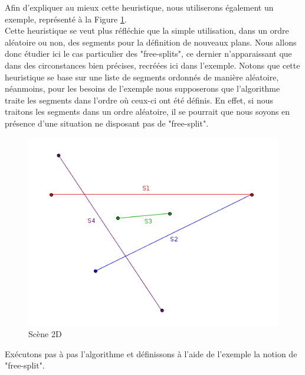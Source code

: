 \documentclass[11pt,a4paper]{article}
\theoremstyle{definition}
\theoremstyle{remark}
\begin{document}
Afin d'expliquer au mieux cette heuristique, nous utiliserons également un exemple, représenté à la Figure \ref{scene_splits}. \\

Cette heuristique se veut plus réfléchie que la simple utilisation, dans un ordre aléatoire ou non, des segments pour la définition de nouveaux plans. Nous allons donc étudier ici le cas particulier des "free-splits", ce dernier n'apparaissant que dans des circonstances bien précises, recréées ici dans l'exemple. Notons que cette heuristique se base sur une liste de segments ordonnés de manière aléatoire, néanmoins, pour les besoins de l'exemple nous supposerons que l'algorithme traite les segments dans l'ordre où ceux-ci ont été définis. En effet, si nous traitons les segments dans un ordre aléatoire, il se pourrait que nous soyons en présence d'une situation ne disposant pas de "free-split".

\begin{figure}[!h]
\centering
\includegraphics[scale=0.5]{free_splits_2.png}
\caption{Scène 2D}
\label{scene_splits}
\end{figure}

Exécutons pas à pas l'algorithme et définissons à l'aide de l'exemple la notion de "free-split". \\
\end{document}
